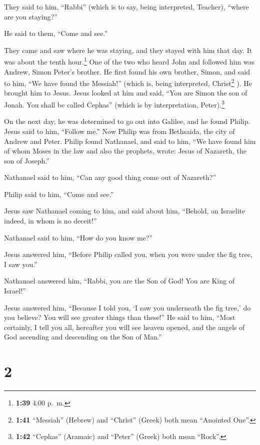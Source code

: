 They said to him, ``Rabbi'' (which is to say, being interpreted,
Teacher), ``where are you staying?''

 He said to them, ``Come and see.''

They came and saw where he was staying, and they stayed with him that
day. It was about the tenth hour.\footnote{\textbf{1:39} 4:00 p.~m.}
 One of the two who heard John and followed him was
Andrew, Simon Peter's brother.  He first found his own
brother, Simon, and said to him, ``We have found the Messiah!'' (which
is, being interpreted, Christ\footnote{\textbf{1:41} ``Messiah''
  (Hebrew) and ``Christ'' (Greek) both mean ``Anointed One''.} ).
 He brought him to Jesus. Jesus looked at him and said,
``You are Simon the son of Jonah. You shall be called Cephas'' (which is
by interpretation, Peter).\footnote{\textbf{1:42} ``Cephas'' (Aramaic)
  and ``Peter'' (Greek) both mean ``Rock''.}

 On the next day, he was determined to go out into
Galilee, and he found Philip. Jesus said to him, ``Follow me.''
 Now Philip was from Bethsaida, the city of Andrew and
Peter.  Philip found Nathanael, and said to him, ``We
have found him of whom Moses in the law and also the prophets, wrote:
Jesus of Nazareth, the son of Joseph.''

 Nathanael said to him, ``Can any good thing come out of
Nazareth?''

Philip said to him, ``Come and see.''

 Jesus saw Nathanael coming to him, and said about him,
``Behold, an Israelite indeed, in whom is no deceit!''

 Nathanael said to him, ``How do you know me?''

Jesus answered him, ``Before Philip called you, when you were under the
fig tree, I saw you.''

 Nathanael answered him, ``Rabbi, you are the Son of God!
You are King of Israel!''

 Jesus answered him, ``Because I told you, `I saw you
underneath the fig tree,' do you believe? You will see greater things
than these!''  He said to him, ``Most certainly, I tell
you all, hereafter you will see heaven opened, and the angels of God
ascending and descending on the Son of Man.''

\hypertarget{section-1}{%
\section{2}\label{section-1}}


